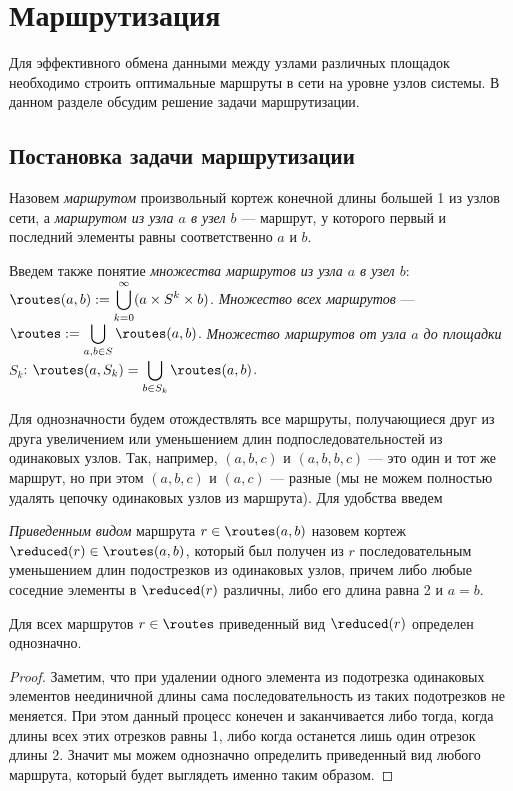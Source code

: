 \section{Маршрутизация}
\label{RoutingSection}

Для эффективного обмена данными между узлами различных площадок необходимо строить оптимальные маршруты в сети на уровне узлов системы. В данном разделе обсудим решение задачи маршрутизации.

\subsection{Постановка задачи маршрутизации}

\begin{definition}
    Назовем \textit{маршрутом} произвольный кортеж конечной длины большей 1 из узлов сети, а \textit{маршрутом из узла $a$ в узел $b$} --- маршрут, у которого первый и последний элементы равны соответственно $a$ и $b$.
\end{definition}

\begin{definition}
    Введем также понятие \textit{множества маршрутов из узла $a$ в узел $b$}: $\routes(a, b) := \displaystyle \bigcup_{k = 0}^{\infty} ({a} \times S^k \times {b})$. \textit{Множество всех маршрутов} --- $\routes := \displaystyle \bigcup_{a, b \in S} \routes(a, b)$. \textit{Множество маршрутов от узла $a$ до площадки $S_k$}: $\routes(a, S_k) = \displaystyle \bigcup_{b \in S_k} \routes(a, b)$.
\end{definition}

Для однозначности будем отождествлять все маршруты, получающиеся друг из друга увеличением или уменьшением длин подпоследовательностей из одинаковых узлов. Так, например, $(a, b, c)$ и $(a, b, b, c)$ --- это один и тот же маршрут, но при этом $(a, b, c)$ и $(a, c)$ --- разные (мы не можем полностью удалять цепочку одинаковых узлов из маршрута). Для удобства введем

\begin{definition}
\label{RouteReducedView}
    \textit{Приведенным видом} маршрута $r \in \routes(a, b)$ назовем кортеж $\reduced(r) \in \routes(a, b)$, который был получен из $r$ последовательным уменьшением длин подострезков из одинаковых узлов, причем либо любые соседние элементы в $\reduced(r)$ различны, либо его длина равна 2 и $a = b$.
\end{definition}

\begin{claim}
    Для всех маршрутов $r \in \routes$ приведенный вид $\reduced(r)$ определен однозначно.
\end{claim}
\begin{proof}
    Заметим, что при удалении одного элемента из подотрезка одинаковых элементов неединичной длины сама последовательность из таких подотрезков не меняется. При этом данный процесс конечен и заканчивается либо тогда, когда длины всех этих отрезков равны 1, либо когда останется лишь один отрезок длины 2. Значит мы можем однозначно определить приведенный вид любого маршрута, который будет выглядеть именно таким образом.
\end{proof}

